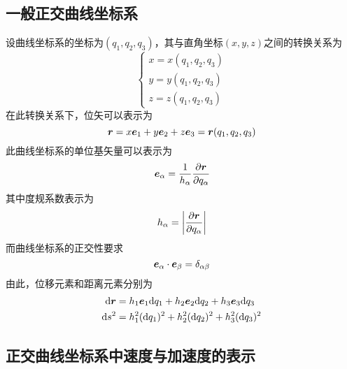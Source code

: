 \subsection{一般正交曲线坐标系}

设曲线坐标系的坐标为$(q_1,q_2,q_3)$，其与直角坐标$(x,y,z)$之间的转换关系为
\begin{equation}
\begin{cases}
	x = x(q_1,q_2,q_3) \\
	y = y(q_1,q_2,q_3) \\
	z = z(q_1,q_2,q_3)
\end{cases}
\end{equation}
在此转换关系下，位矢可以表示为
\begin{equation}
	\boldsymbol{r} = x\boldsymbol{e}_1 + y \boldsymbol{e}_2 + z \boldsymbol{e}_3 = \boldsymbol{r}(q_1,q_2,q_3)
\end{equation}
此曲线坐标系的单位基矢量可以表示为
\begin{equation}
	\boldsymbol{e}_\alpha = \dfrac{1}{h_\alpha} \dfrac{\partial \boldsymbol{r}}{\partial q_\alpha}
\end{equation}
其中度规系数表示为
\begin{equation}
	h_\alpha = \left|\dfrac{\partial \boldsymbol{r}}{\partial q_\alpha}\right|
\end{equation}
而曲线坐标系的正交性要求
\begin{equation}
	\boldsymbol{e}_\alpha \cdot \boldsymbol{e}_\beta = \delta_{\alpha\beta}
\end{equation}
由此，位移元素和距离元素分别为
\begin{align}
	\mathrm{d}\boldsymbol{r} & = h_1\boldsymbol{e}_1\mathrm{d}q_1 + h_2\boldsymbol{e}_2\mathrm{d}q_2 + h_3\boldsymbol{e}_3\mathrm{d}q_3 \\
	\mathrm{d}s^2 & = h_1^2(\mathrm{d}q_1)^2 + h_2^2(\mathrm{d}q_2)^2 + h_3^2(\mathrm{d}q_3)^2
\end{align}

\subsection{正交曲线坐标系中速度与加速度的表示}

